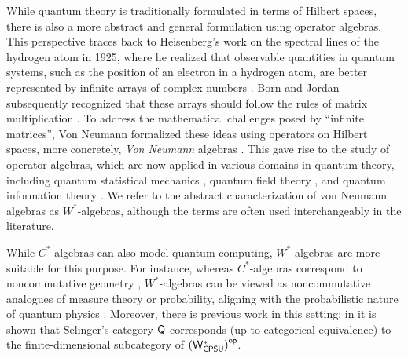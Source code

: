  While quantum theory is traditionally formulated in terms of Hilbert spaces, there is also a more abstract and general formulation using operator algebras. This perspective traces back to Heisenberg’s work on the spectral lines of the hydrogen atom in 1925, where he realized that observable quantities in quantum systems, such as the position of an electron in a hydrogen atom, are better represented by infinite arrays of complex numbers \cite{heisenbergUeberQuantentheoretischeUmdeutung1925}. Born and Jordan subsequently recognized that these arrays should follow the rules of matrix multiplication \cite{bornZurQuantenmechanik1925}. To address the mathematical challenges posed by ``infinite matrices'', Von Neumann formalized these ideas using operators on Hilbert spaces, more concretely, \emph{Von Neumann} algebras \cite{neumann1927wahrscheinlichkeitstheoretischer}. This gave rise to the study of operator algebras, which are now applied in various domains in quantum theory, including quantum statistical mechanics \cite{bratteliOperatorAlgebrasQuantum1987}, quantum field theory \cite{arakiMathematicalTheoryQuantum1999,haagAlgebraicApproachQuantum1964}, and quantum information theory \cite{keylFundamentalsQuantumInformation2002}. We refer to the abstract characterization of von Neumann algebras as $W^*$-algebras, although the terms are often used interchangeably in the literature.


  While $C^*$-algebras can also model quantum computing, $W^*$-algebras are more suitable for this purpose. For instance, whereas $C^*$-algebras correspond to noncommutative geometry \cite{connesNoncommutativeGeometry1995}, $W^*$-algebras can be viewed as noncommutative analogues of measure theory or probability, aligning with the probabilistic nature of quantum physics \cite{hamhalterQuantumMeasureTheory2003,HansQuantumProbabilityQuantumInformationTheory10}. Moreover, there is previous work in this setting: in \cite{choSemanticsQuantumProgramming2016} it is shown that Selinger’s category $\mathsf{Q}$ corresponds (up to categorical equivalence) to the finite-dimensional subcategory of $\left(\mathsf{W^*_{CPSU}}\right)^{\mathsf{op}}$.


